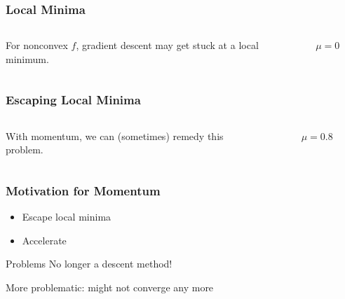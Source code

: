 \documentclass[aspectratio=1610,onlytextwidth]{beamer}
\begin{document}
\begin{frame}[c]
  \frametitle{Local Minima}

  \begin{columns}
    \begin{column}{0.45\textwidth}
      For nonconvex \(f\), gradient descent may get stuck at a local minimum.
    \end{column}

    \begin{column}{0.45\textwidth}
      \begin{figure}[htpb]
        \centering
        \caption{%
          $\mu = 0$
        }
      \end{figure}
    \end{column}
  \end{columns}

\end{frame}

\begin{frame}[c]
  \frametitle{Escaping Local Minima}

  \begin{columns}
    \begin{column}{0.45\textwidth}
      With momentum, we can (sometimes) remedy this problem.
    \end{column}
    \begin{column}{0.45\textwidth}
      \begin{figure}[htpb]
        \centering
        \caption{%
          $\mu = 0.8$
        }
      \end{figure}
    \end{column}
  \end{columns}

\end{frame}

\begin{frame}[c]
  \frametitle{Motivation for Momentum}
  \begin{itemize}
    \item Escape local minima
    \item Accelerate
  \end{itemize}

  \pause

  \begin{block}{Problems}
    No longer a descent method!

    \medskip

    More problematic: might not converge any more

  \end{block}

\end{frame}
\end{document}
